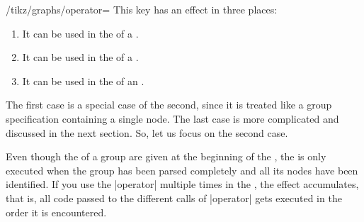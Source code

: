 \begin{key}{/tikz/graphs/operator=}
    This key has an effect in three places:
    \begin{enumerate}
        \item It can be used in the  of a .
        \item It can be used in the  of a .
        \item It can be used in the  of an .
    \end{enumerate}
    The first case is a special case of the second, since it is treated like a
    group specification containing a single node. The last case is more
    complicated and discussed in the next section. So, let us focus on the
    second case.

    Even though the  of a group are given at the beginning of the
    , the  is only executed when the group
    has been parsed completely and all its nodes have been identified. If you
    use the |operator| multiple times in the , the effect
    accumulates, that is, all code passed to the different calls of |operator|
    gets executed in the order it is encountered.


\end{key}

